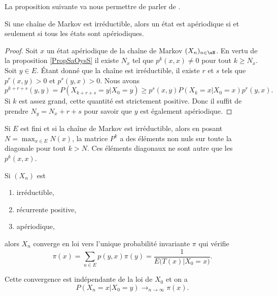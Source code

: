 La proposition suivante va nous permettre de parler de .
\begin{proposition}
    Si une chaîne de Markov est irréductible, alors un état est apériodique si et seulement si tous les états sont apériodiques.
\end{proposition}

\begin{proof}
    Soit \( x\) un état apériodique de la chaîne de Markov \( (X_n)_{n\in \eN}\). En vertu de la proposition \ref{PropSaOysS} il existe \( N_x\) tel que \( p^k(x,x)\neq 0\) pour tout \( k\geq N_x\). Soit \( y\in E\). Étant donné que la chaîne est irréductible, il existe \( r\) et \( s\) tels que\( p^r(x,y)>0\) et \( p^s(y,x)>0\). Nous avons
    \begin{equation}
        p^{k+r+s}(y,y)=P(X_{k+r+s}=y|X_0=y)\geq p^s(x,y)P(X_k=x|X_0=x)p^r(y,x).
    \end{equation}
    Si \( k\) est assez grand, cette quantité est strictement positive. Donc il suffit de prendre \( N_y=N_x+r+s\) pour savoir que \( y\) est également apériodique.
\end{proof}

Si \( E\) est fini et si la chaîne de Markov est irréductible, alors en posant \( N=\max_{x\in E}N(x)\), la matrice \( P^k\) a des éléments non nuls sur toute la diagonale pour tout \( k>N\). Ces éléments diagonaux ne sont autre que les \( p^k(x,x)\).

\begin{theorem}
    Si \( (X_n)\) est
    \begin{enumerate}
        \item
            irréductible,
        \item
            récurrente positive,
        \item
            apériodique,
    \end{enumerate}
    alors \( X_n\) converge en loi vers l'unique probabilité invariante \( \pi\) qui vérifie
    \begin{equation}
        \pi(x)=\sum_{u\in E}p(y,x)\pi(y)=\frac{1}{ E\big( T(x)|X_0=x \big) }.
    \end{equation}

    Cette convergence est indépendante de la loi de \( X_0\) et on a
    \begin{equation}
        P(X_n=x|X_0=y)\to_{n\to \infty} \pi(x).
    \end{equation}
\end{theorem}

